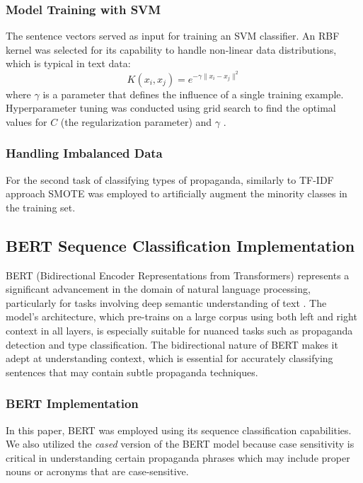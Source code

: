 \documentclass[twocolumn]{article}
\begin{document}
\subsubsection*{Model Training with SVM}
The sentence vectors served as input for training an SVM classifier. An RBF kernel was selected for its capability to handle non-linear data distributions, which is typical in text data:
\[ K(x_i, x_j) = e^{-\gamma \|x_i - x_j\|^2} \]
where \( \gamma \) is a parameter that defines the influence of a single training example. Hyperparameter tuning was conducted using grid search to find the optimal values for \( C \) (the regularization parameter) and \( \gamma \) .

\subsubsection*{Handling Imbalanced Data}
For the second task of classifying types of propaganda, similarly to TF-IDF approach SMOTE was employed to artificially augment the minority classes in the training set.

\subsection{BERT Sequence Classification Implementation}

BERT (Bidirectional Encoder Representations from Transformers) represents a significant advancement in the domain of natural language processing, particularly for tasks involving deep semantic understanding of text . The model's architecture, which pre-trains on a large corpus using both left and right context in all layers, is especially suitable for nuanced tasks such as propaganda detection and type classification. The bidirectional nature of BERT makes it adept at understanding context, which is essential for accurately classifying sentences that may contain subtle propaganda techniques.

\subsubsection*{BERT Implementation}
In this paper, BERT was employed using its sequence classification capabilities. We also utilized the \textit{cased} version of the BERT model because case sensitivity is critical in understanding certain propaganda phrases which may include proper nouns or acronyms that are case-sensitive.
\end{document}
